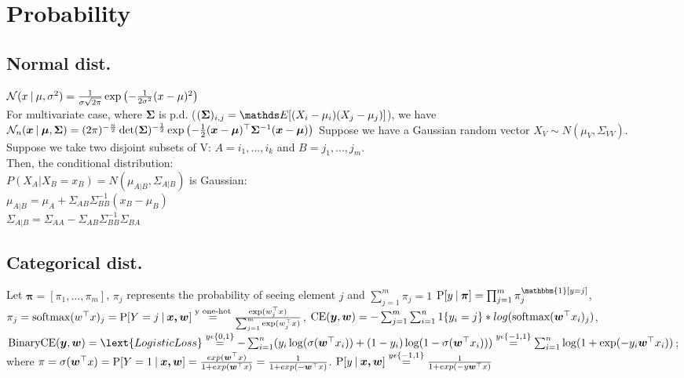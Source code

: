 \section{Probability}
\subsection{Normal dist.}
$\mathcal{N}(x\:|\: \mu, \sigma^{2}) = \frac{1}{\sigma \sqrt{2\pi}}\exp\left(-\frac{1}{2\sigma^{2}}(x - \mu)^{2}\right)$\\
For multivariate case, where $\bm{\Sigma}$ is p.d. ($(\bm{\Sigma})_{i,j} = \E{(X_{i} - \mu_{i})(X_{j} - \mu_{j})}$),
we have $\mathcal{N}_{n}(\bm{x}\:|\: \bm{\mu}, \bm{\Sigma}) =
(2\pi)^{-\frac{n}{2}}\det(\bm{\Sigma})^{-\frac{1}{2}}\exp\left(-\frac{1}{2}(\bm{x} -
\bm{\mu})^{\top}\bm{\Sigma}^{-1}(\bm{x} - \bm{\mu})\right)$
Suppose we have a Gaussian random vector $X_V \sim N(\mu_V, \Sigma_{VV})$.\\
Suppose we take two disjoint subsets of V: $A={i_1,...,i_k}$ and $B={j_1,...,j_m}$.\\
Then, the conditional distribution: \\
$P(X_A|X_B=x_B)=N(\mu_{A|B}, \Sigma_{A|B})$ is Gaussian:\\
$\mu_{A|B}=\mu_A+\Sigma_{AB}\Sigma^{-1}_{BB}(x_B-\mu_B)$\\
$\Sigma_{A|B}=\Sigma_{AA}-\Sigma_{AB}\Sigma^{-1}_{BB}\Sigma_{BA}$

\subsection{Categorical dist.}
Let $\bm{\pi} = [\pi_{1}, \dots, \pi_{m}]$, $\pi_{j}$ represents the probability of seeing element $j$ and
$\sum_{j=1}^{m}\pi_{j} = 1$
$\prob{y}[\bm{\pi}] = \prod_{j=1}^{m}\pi_{j}^{\mathbbm{1}[y = j]}$,
$\pi_{j}=\text{softmax}(w^{\top}x)_{j} = \prob{Y=j}[\bm{x,w}] \overset{\text{y one-hot}}{=}
\frac{\exp(w_{j}^{\top}x)}{\sum_{j=1}^{m}\exp(w_{j}^{\top}x)}$,
$\text{CE} (\bm{y},\bm{w})=-\sum_{j=1}^{m}\sum_{i=1}^{n}1\cset{y_{i}=j}*log(\text{softmax}(\bm{w}^{\top}x_{i})_{j})$,
$\text{BinaryCE} (\bm{y},\bm{w}) =\lext{LogisticLoss} \overset{y\epsilon\{0,1\}}{=} -\sum_{i=1}^{n}(y_{i}\log(
\sigma(\bm{w}^{\top}x_{i}))+(1-y_{i})\log(1-\sigma(\bm{w}^{\top}x_{i})))
\overset{y\epsilon\{-1,1\}}{=}\sum_{i=1}^{n}\log(1+\exp(-y_{i}\bm{w}^{\top}x_{i}))$;
where
$\pi = \sigma(\bm{w}^{\top}x) = \prob{Y=1}[\bm{x,w}] = \frac{exp(\bm{w}^{\top}x)}{1 + exp(\bm{w}^{\top}x)} =
\frac{1}{1 + exp(-\bm{w}^{\top}x)}$. $\prob{y}[\bm{x,w}] \overset{y\epsilon\{-1,1\}}{=}
\frac{1}{1 + exp(-y\bm{w}^{\top}x)}$


